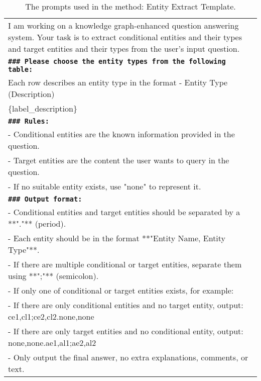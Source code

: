 \begin{table*}[h]
    \centering
    \caption{The prompts used in the method: Entity Extract Template.}
    \label{table:template1}
    
    \begin{tabular}{p{15cm}}
        \toprule
        \vspace{2mm} 
        I am working on a knowledge graph-enhanced question answering system. Your task is to extract conditional entities and their types and target entities and their types from the user's input question. \\
        \vspace{2mm}  
        \textbf{\texttt{\#\#\# Please choose the entity types from the following table:}} \\
        Each row describes an entity type in the format - Entity Type (Description) \\
        \{label\_description\} \\
        
        \vspace{2mm}  
        \textbf{\texttt{\#\#\# Rules:}} \\
        - Conditional entities are the known information provided in the question. \\
        - Target entities are the content the user wants to query in the question. \\
        - If no suitable entity exists, use "none" to represent it. \\
        
        \vspace{2mm}  
        \textbf{\texttt{\#\#\# Output format:}} \\
        - Conditional entities and target entities should be separated by a **"."** (period). \\
        - Each entity should be in the format **"Entity Name, Entity Type"**. \\
        - If there are multiple conditional or target entities, separate them using **";"** (semicolon). \\
        - If only one of conditional or target entities exists, for example: \\
          - If there are only conditional entities and no target entity, output: ce1,cl1;ce2,cl2.none,none \\
          - If there are only target entities and no conditional entity, output: none,none.ae1,al1;ae2,al2 \\
        - Only output the final answer, no extra explanations, comments, or text. \\
        

\end{tabular}
\end{table*}
